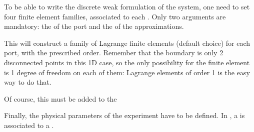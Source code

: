 \documentclass[letterpaper,10pt,english]{sphinxmanual}
\begin{document}
\sphinxAtStartPar
To be able to write the discrete weak formulation of the system, one
need to set four finite element families, associated to each .
Only two arguments are mandatory: the  of the port and the
 of the approximations.

\begin{sphinxVerbatim}[commandchars=\\\{\}]
   
   
   
   
\end{sphinxVerbatim}

\sphinxAtStartPar
This will construct a family of Lagrange finite elements (default
choice) for each port, with the prescribed order. Remember that the
boundary is only 2 disconnected points in this 1D case, so the only
possibility for the finite element is 1 degree of freedom on each of
them: Lagrange elements of order 1 is the easy way to do that.

\sphinxAtStartPar
Of course, this  must be added to the 

\begin{sphinxVerbatim}[commandchars=\\\{\}]
\end{sphinxVerbatim}

\sphinxAtStartPar
Finally, the physical parameters of the experiment have to be defined.
In , a  is associated to a .
\end{document}
